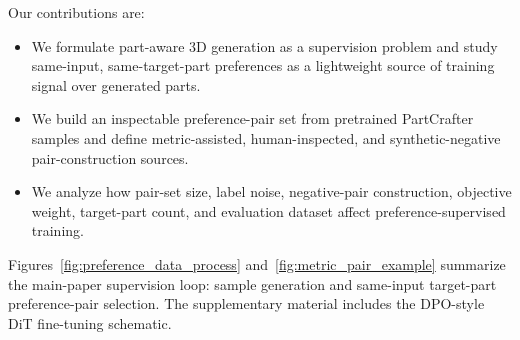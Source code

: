 \documentclass[10pt,twocolumn,letterpaper]{article}
\begin{document}
Our contributions are:
\begin{itemize}
    \item We formulate part-aware 3D generation as a supervision problem and study same-input, same-target-part preferences as a lightweight source of training signal over generated parts.
    \item We build an inspectable preference-pair set from pretrained PartCrafter samples and define metric-assisted, human-inspected, and synthetic-negative pair-construction sources.
    \item We analyze how pair-set size, label noise, negative-pair construction, objective weight, target-part count, and evaluation dataset affect preference-supervised training.
\end{itemize}

Figures~\ref{fig:preference_data_process} and~\ref{fig:metric_pair_example} summarize the main-paper supervision loop: sample generation and same-input target-part preference-pair selection. The supplementary material includes the DPO-style DiT fine-tuning schematic.
\end{document}
